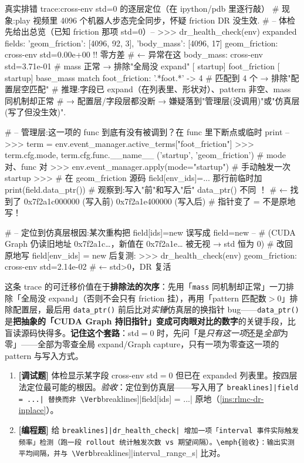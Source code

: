\begin{codebox}[Python]{真实排错 trace:cross-env std=0 的逐层定位（在 ipython/pdb 里逐行敲）}
# 现象:play 视频里 4096 个机器人步态完全同步，怀疑 friction DR 没生效.
# -- 体检先给出总览（已知 friction 那项 std=0）--
>>> dr_health_check(env)
expanded fields: {'geom_friction': [4096, 92, 3], 'body_mass': [4096, 17]}
  geom_friction: cross-env std=0.00e+00   !! 零方差          # ← 异常在这
  body_mass:     cross-env std=3.71e-01                      # mass 正常 → 排除"全局没 expand"
  [ startup] foot_friction
  [ startup] base_mass
  match foot_friction: '.*foot.*' -> 4                       # 匹配到 4 个 → 排除"配置层空匹配"
# 推理:字段已 expand（在列表里、形状对）、pattern 非空、mass 同机制却正常
#       → 配置层/字段层都没断 → 嫌疑落到"管理层(没调用)"或"仿真层(写了但没生效)".

# -- 管理层:这一项的 func 到底有没有被调到？在 func 里下断点或临时 print --
>>> term = env.event_manager.active_terms["foot_friction"]
>>> term.cfg.mode, term.cfg.func.__name__
('startup', 'geom_friction')                                 # mode 对、func 对
>>> env.event_manager.apply(mode="startup")                  # 手动触发一次 startup
>>> # 在 geom_friction 源码 field[env_ids]=... 那行前临时加 print(field.data_ptr())
#    观察到:写入"前"和写入"后" data_ptr() 不同 ！                 # ← 找到了
0x7f2a1c000000   (写入前)
0x7f2a1e400000   (写入后)                                     # 指针变了 = 不是原地写！

# -- 定位到仿真层根因:某次重构把 field[ids]=new 误写成 field=new --
#    (CUDA Graph 仍读旧地址 0x7f2a1c…，新值在 0x7f2a1e… 被无视 → std 恒为 0)
# 改回原地写 field[env_ids] = new 后复测:
>>> dr_health_check(env)
  geom_friction: cross-env std=2.14e-02                      # ← std>0，DR 复活
\end{codebox}

\noindent{}这条 trace 的可迁移价值在于\textbf{排除法的次序}：先用「\verb|mass| 同机制却正常」一刀排除「全局没 expand」（否则不会只有 friction 挂），再用「pattern 匹配数$>$0」排除配置层，最后用 \verb|data_ptr()| 前后比对\emph{实锤}仿真层的换指针 bug——\verb|data_ptr()| 是\textbf{把抽象的「CUDA Graph 持旧指针」变成可肉眼对比的数字}的关键手段，比盲读源码快得多。\textbf{记住这个套路}：std$=0$ 时，先问「是\emph{只有这一项}还是\emph{全部}为零」——全部为零查全局 expand/Graph capture，只有一项为零查这一项的 pattern 与写入方式。

\begin{practice}[本节练习]
\begin{enumerate}
  \item \textbf{[调试题]} 体检显示某字段 cross-env std$=0$ 但已在 expanded 列表里。按四层法定位最可能的根因。\emph{验收}：定位到仿真层——写入用了 \Verb[breaklines]|field = ...| 替换而非 \Verb[breaklines]|field[ids] = ...| 原地（\cref{ins:rlmc-dr-inplace}）。
  \item \textbf{[编程题]} 给 \Verb[breaklines]|dr_health_check| 增加一项「interval 事件实际触发频率」检测（跑一段 rollout 统计触发次数 vs 期望间隔）。\emph{验收}：输出实测平均间隔，并与 \Verb[breaklines]|interval_range_s| 比对。
\end{enumerate}
\end{practice}

